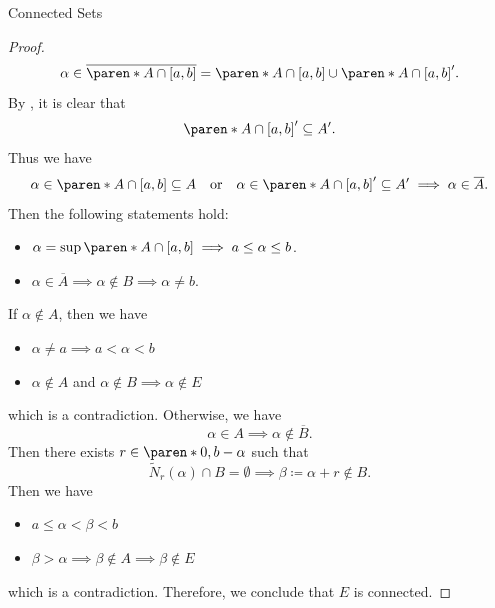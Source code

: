 \begin{section}{Connected Sets}
\begin{proof}
    \[
    \alpha \in \overline{\paren*{A \cap [a, b]}} = \paren*{A \cap [a, b]} \cup \paren*{A \cap [a, b]}'.
    \]
    By , it is clear that
    \[
    \paren*{A \cap [a, b]}' \subseteq A'.
    \]
    Thus we have
    \[
    \alpha \in \paren*{A \cap [a, b]} \subseteq A \quad \text{or} \quad
    \alpha \in \paren*{A \cap [a, b]}' \subseteq A' \implies \alpha \in \overline{A}.
    \]
    Then the following statements hold:
    \begin{itemize}
        \item $\alpha = \sup\paren*{A \cap [a, b]} \implies a \leq \alpha \leq b$.
        \item $\alpha \in \overline{A} \implies \alpha \notin B \implies \alpha \neq b$.
    \end{itemize}
    If $\alpha \notin A$, then we have
    \begin{itemize}
        \item $\alpha \neq a \implies a < \alpha < b$
        \item $\alpha \notin A$ and $\alpha \notin B \implies \alpha \notin E$
    \end{itemize}
    which is a contradiction. Otherwise, we have
    \[
    \alpha \in A \implies \alpha \notin \overline{B}.
    \]
    Then there exists $r \in \paren*{0, b - \alpha}$ such that
    \[
    \widetilde{N}_{r}(\alpha) \cap B = \emptyset \implies \beta \coloneqq \alpha + r \notin B.
    \]
    Then we have
    \begin{itemize}
        \item $a \leq \alpha < \beta < b$
        \item $\beta > \alpha \implies \beta \notin A \implies \beta \notin E$
    \end{itemize}
    which is a contradiction. Therefore, we conclude that $E$ is connected.
\end{proof}

\end{section}